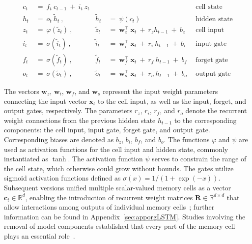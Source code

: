 \begin{align}
c_t \ &= \  f_t \ c_{t-1} \ + \ i_t \ z_t &  & &\text{cell state} \\
h_t  \ &= \ o_t \ \tilde{h}_t \ , & \tilde{h}_t \ &= \ \psi \left( c_t\right)
  &\text{hidden state} \\
z_t \ &= \ \varphi \left( \tilde{z}_t \right) \ , 
  &\tilde{z}_t \ &=  \ \mathbf{w}^\top_{z} \ \mathbf{x}_t \ + \
  r_{z}  h_{t-1} \ + \  b_{z} \ \
  &\text{cell input} \\
i_t \ &= \ \sigma \left( \tilde{i}_t  \right) \ , 
  &\tilde{i}_t \ &= \ \mathbf{w}^\top_{i} \ \mathbf{x}_t \ + \
  r_{i}  \ h_{t-1} \ + \  b_{i} \ \
  &\text{input gate} \\
f_t \ &= \ \sigma \left(  \tilde{f}_t \right) \ , 
  &\tilde{f}_t \ &= \ \mathbf{w}^\top_{f} \ \mathbf{x}_t  \ + \
  r_{f}  \ h_{t-1} \ + \  b_{f} \ \
  &\text{forget gate} \\
o_t \ &= \ \sigma \left( \tilde{o}_t \right) \ , 
  &\tilde{o}_t  \ &= \ \mathbf{w}^\top_{o} \ \mathbf{x}_t \ + \
  r_{o}  \ h_{t-1} \ + \  b_{o} \ \
  &\text{output gate} 
\end{align}

The vectors $\mathbf{w}_{z}$, $\mathbf{w}_{i}$, $\mathbf{w}_{f}$, and $\mathbf{w}_{o}$ represent the input weight parameters connecting the input vector $\mathbf{x}_t$ to the cell input, as well as the input, forget, and output gates, respectively. The parameters $r_{z}$, $r_{i}$, $r_{f}$, and $r_{o}$ denote the recurrent weight connections from the previous hidden state $h_{t-1}$ to the corresponding components: the cell input, input gate, forget gate, and output gate. Corresponding biases are denoted as $b_{z}$, $b_{i}$, $b_{f}$, and $b_{o}$. The functions $\varphi$ and $\psi$ are used as activation functions for the cell input and hidden state, commonly instantiated as $\tanh$. The activation function $\psi$ serves to constrain the range of the cell state, which otherwise could grow without bounds. The gates utilize sigmoid activation functions defined as $\sigma \left( x \right)= 1/(1+\exp(-x))$. Subsequent versions unified multiple scalar-valued memory cells as a vector $\mathbf{c}_t \in \mathbb{R}^{d}$, enabling the introduction of recurrent weight matrices $\mathbf{R} \in \mathbb{R}^{d \times d}$ that allow interactions among outputs of individual memory cells~\citep{Greff:15}; further information can be found in Appendix~\ref{sec:apporgLSTM}. Studies involving the removal of model components established that every part of the memory cell plays an essential role~\citep{Greff:15}.

